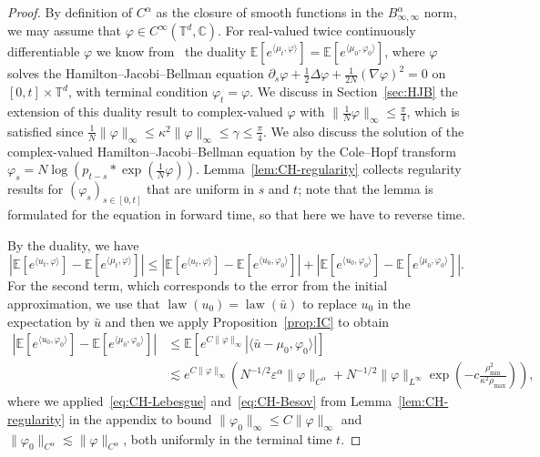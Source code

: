 \documentclass[a4paper,12pt]{article}
\newcommand{\T}{\mathbb{T}}
\newcommand{\C}{\mathbb{C}}
\newcommand{\E}{\mathbb{E}}
\begin{document}
\begin{proof}
  By definition of $C^{\alpha}$ as the closure of smooth functions in the $B^{\alpha}_{\infty,\infty}$ norm, we may assume that $\varphi \in C^\infty(\T^d,\C)$. For real-valued twice continuously differentiable $\varphi$ we know from~\cite{Konarovskyi2019} the duality $\E[e^{\langle\mu_t, \varphi \rangle}] = \E[e^{\langle
    \mu_0, \varphi_0 \rangle}]$, where $\varphi$ solves the Hamilton--Jacobi--Bellman equation $\partial_s \varphi + \frac{1}{2} \Delta \varphi + \frac{1}{2 N} (
  \nabla \varphi )^2 = 0$ on $[0, t] \times \T^d$, with terminal condition $\varphi_t = \varphi$. We discuss in Section~\ref{sec:HJB} the extension of this duality result to complex-valued $\varphi$ with $\|\tfrac1N \varphi\|_\infty \leq \tfrac\pi4$, which is satisfied since $\tfrac1N \|\varphi\|_\infty \leq \kappa^2 \|\varphi\|_\infty \leq \gamma \leq \tfrac\pi4$. We also discuss the solution of the complex-valued Hamilton--Jacobi--Bellman equation by the Cole--Hopf transform $\varphi_s = N \log(p_{t-s}\ast \exp(\tfrac1N \varphi))$. Lemma~\ref{lem:CH-regularity} collects regularity results for $(\varphi_s)_{s \in [0,t]}$ that are uniform in $s$ and $t$; note that the lemma is formulated for the equation in forward time, so that here we have to reverse time.
  
   By the duality, 
   we have
  \begin{equation}\label{eq:main-pr1}
    | \mathbb{E} [e^{\langle u_t, \varphi \rangle}] -\mathbb{E} [e^{\langle
    \mu_t, \varphi \rangle}] | \leq |\mathbb E[e^{\langle u_t,\varphi\rangle}] - \mathbb E[e^{\langle u_0, \varphi_0\rangle}]| + |\mathbb E[e^{\langle u_0,\varphi_0\rangle}] - \mathbb E[e^{\langle \mu_0,\varphi_0\rangle}]|.
  \end{equation}
  For the second term, which corresponds to the error from the initial approximation, we use that $\operatorname{law}(u_0)=\operatorname{law}(\bar u)$ to replace $u_0$ in the expectation by $\bar u$ and then we apply Proposition~\ref{prop:IC} 
  to obtain
  \begin{align*}
    |\mathbb E[e^{\langle u_0,\varphi_0\rangle}] - \mathbb E[e^{\langle \mu_0,\varphi_0\rangle}]| & \leq \mathbb E[e^{C\|\varphi\|_\infty}|\langle \bar u - \mu_0, \varphi_0\rangle|] \\
    & \lesssim e^{C \|\varphi\|_\infty} \left(N^{-1/2}\varepsilon^\alpha \|\varphi\|_{C^{\alpha}}
        + N^{-1/2}\|\varphi\|_{L^\infty}
        \exp\left(-c \frac{\rho_{\min}^2}{\kappa^2\rho_{\max}}\right)\right),
  \end{align*}
  where we applied~\eqref{eq:CH-Lebesgue} and~\eqref{eq:CH-Besov} from Lemma~\ref{lem:CH-regularity} in the appendix to bound $\|\varphi_0\|_\infty \leq C \|\varphi\|_\infty$ and $\|\varphi_0\|_{C^\alpha} \lesssim \|\varphi\|_{C^{\alpha}}$, both uniformly in the terminal time $t$.


\end{proof}
\end{document}
